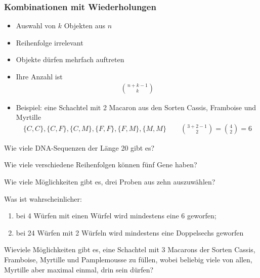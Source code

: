 \begin{frame}
  \frametitle{Kombinationen mit Wiederholungen}
  \begin{itemize}
  \item Auswahl von $k$ Objekten aus $n$
  \item Reihenfolge irrelevant
  \item Objekte dürfen mehrfach auftreten
  \item Ihre Anzahl ist
    \begin{gather*}
      \binom{n+k-1}{k}
    \end{gather*}
  \item Beispiel: eine Schachtel mit 2 Macaron aus den Sorten Cassis, Framboise und Myrtille
    \begin{gather*}
      \{C,C\}, \{C,F\},\{C,M\},\{F,F\},\{F,M\},\{M,M\}
      \qquad
      \binom{3+2-1}{2} = \binom{4}{2} = 6
    \end{gather*}
  \end{itemize}
\end{frame}

\begin{Abschluss}
\item Wie viele DNA-Sequenzen der Länge 20 gibt es?
\item Wie viele verschiedene Reihenfolgen können fünf Gene haben?
\item Wie viele Möglichkeiten gibt es, drei Proben aus zehn auszuwählen?  
\item Was ist wahrscheinlicher:
  \begin{enumerate}
  \item bei 4 Würfen mit einen Würfel wird mindestens eine 6 geworfen;
  \item bei 24 Würfen mit 2 Würfeln wird mindestens eine Doppelsechs geworfen
  \end{enumerate}
\item Wieviele Möglichkeiten gibt es, eine Schachtel mit 3 Macarons
  der Sorten Cassis, Framboise, Myrtille und Pamplemousse zu füllen,
  wobei beliebig viele von allen, Myrtille aber maximal einmal, drin
  sein dürfen?
\end{Abschluss}



